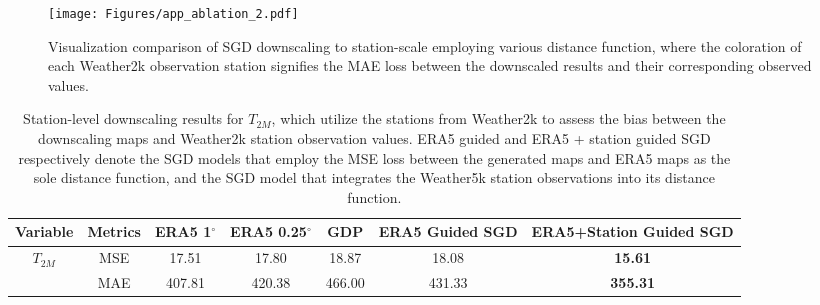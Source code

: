 \begin{figure*}[t]
    \centering
\texttt{[image: Figures/app\_ablation\_2.pdf]}
    \caption{Visualization comparison of SGD downscaling to station-scale employing various distance function, where the coloration of each Weather2k observation station signifies the MAE loss between the downscaled results and their corresponding observed values. }
    \label{fig:app_ablation}
\end{figure*}

\begin{table*}[t]
\centering
\caption{Station-level downscaling results for $T_{2M}$, which utilize the stations from Weather2k to assess the bias between the downscaling maps and Weather2k station observation values. 
ERA5 guided and ERA5 + station guided SGD respectively denote the SGD models that employ the MSE loss between the generated maps and ERA5 maps as the sole distance function, and the SGD model that integrates the Weather5k station observations into its distance function. }
\begin{tabular}{c| c| c c c c c}
    \toprule[1pt]
     Variable&Metrics&ERA5 1$^\circ$&ERA5 0.25$^\circ$&GDP &ERA5 Guided SGD&ERA5+Station Guided SGD\\
    \midrule
    \multirow{2}{*}{$T_{2M}$}
    &MSE& 17.51 & 17.80 & 18.87 & 18.08 & \textbf{15.61}\\
    &MAE& 407.81 & 420.38 & 466.00 & 431.33 & \textbf{355.31}\\
    \bottomrule[1pt]
  \end{tabular}

 \label{tab:app_ablation}
\end{table*}